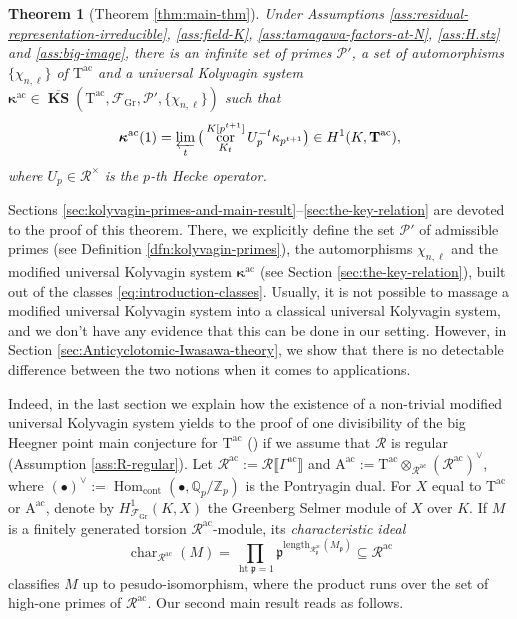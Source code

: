 \documentclass[12pt,reqno]{amsart}
\newtheorem{theoremx}{Theorem}
\theoremstyle{definition}
\theoremstyle{remark}
\newcommand{\numberset}{\mathbb}
\newcommand{\Q}{\numberset{Q}}
\newcommand{\Z}{\numberset{Z}}
\newcommand{\T}{\boldsymbol{\mathrm{T}}}
\newcommand{\calR}{\mathcal{R}}
\newcommand{\A}{\boldsymbol{\mathrm{A}}}
\DeclareMathOperator{\Hom}{Hom}
\DeclareMathOperator{\Char}{char}
\DeclareMathOperator{\Cor}{cor}
\DeclareMathOperator{\hight}{\mathrm{ht}}
\DeclareMathOperator{\ks}{KS}
\newcommand{\KS}{\boldsymbol{\ks}}
\newcommand{\ac}{\mathrm{ac}}
\newcommand{\Gr}{\mathrm{Gr}}
\newcommand{\cont}{\mathrm{cont}}
\newcommand{\length}{\mathrm{length}}
\newcommand{\gk}{\kappa}
\newcommand{\p}{\mathfrak{p}}
\begin{document}
\begin{theoremx}[Theorem \ref{thm:main-thm}]\label{thm:A}
    Under Assumptions \ref{ass:residual-representation-irreducible}, \ref{ass:field-K}, \ref{ass:tamagawa-factors-at-N}, \ref{ass:H.stz} and \ref{ass:big-image}, there is an infinite set of primes $\mathcal{P}'$, a set of automorphisms $\{\chi_{n,\ell}\}$ of $\T^{\ac}$ and a universal Kolyvagin system $\boldsymbol{\gk}^{\ac}\in\overline{\KS}(\T^{\ac},\mathcal{F}_{\Gr},\mathcal{P}',\{\chi_{n,\ell}\})$ such that
    \begin{equation*}
        \boldsymbol{\gk}^{\ac}(1)=\varprojlim_t\big(\Cor^{K[p^{t+1}]}_{K_t}U_p^{-t}\gk_{p^{t+1}}\big)\in H^1(K,\T^{\ac}),
    \end{equation*}
    where $U_p\in\calR^\times$ is the $p$-th Hecke operator.
\end{theoremx}

Sections \ref{sec:kolyvagin-primes-and-main-result}--\ref{sec:the-key-relation} are devoted to the proof of this theorem. There, we explicitly define the set $\mathcal{P}'$ of admissible primes (see Definition \ref{dfn:kolyvagin-primes}), the automorphisms $\chi_{n,\ell}$ and the modified universal Kolyvagin system $\boldsymbol{\gk}^{\ac}$ (see Section \ref{sec:the-key-relation}), built out of the classes \eqref{eq:introduction-classes}. Usually, it is not possible to massage a modified universal Kolyvagin system into a classical universal Kolyvagin system, and we don't have any evidence that this can be done in our setting. However, in Section \ref{sec:Anticyclotomic-Iwasawa-theory}, we show that there is no detectable difference between the two notions when it comes to applications.

Indeed, in the last section we explain how the existence of a non-trivial modified universal Kolyvagin system yields to the proof of one divisibility of the big Heegner point main conjecture for $\T^\ac$ (\cite[Conjecture 10.8]{Longo-Vigni11:quaternion-algebras-Hida-families}) if we assume that $\calR$ is regular (Assumption \ref{ass:R-regular}). Let $\calR^\ac:=\calR\llbracket\Gamma^\ac\rrbracket$ and $\A^\ac:=\T^\ac\otimes_{\calR^\ac}(\calR^\ac)^\vee$, where $(\bullet)^\vee:=\Hom_{\cont}(\bullet,\Q_p/\Z_p)$ is the Pontryagin dual. For $X$ equal to $\T^\ac$ or $\A^\ac$, denote by $H^1_{\mathcal{F}_\Gr}(K,X)$ the Greenberg Selmer module of $X$ over $K$. If $M$ is a finitely generated torsion $\calR^\ac$-module, its \emph{characteristic ideal}
\begin{equation*}
         \Char_{\calR^{\ac}}(M)=\prod_{\hight\p=1} \p^{\length_{\calR^\ac_\p}(M_\p)}\subseteq \calR^\ac
\end{equation*}
classifies $M$ up to pesudo-isomorphism, where the product runs over the set of high-one primes of $\calR^\ac$. Our second main result reads as follows.
\end{document}
